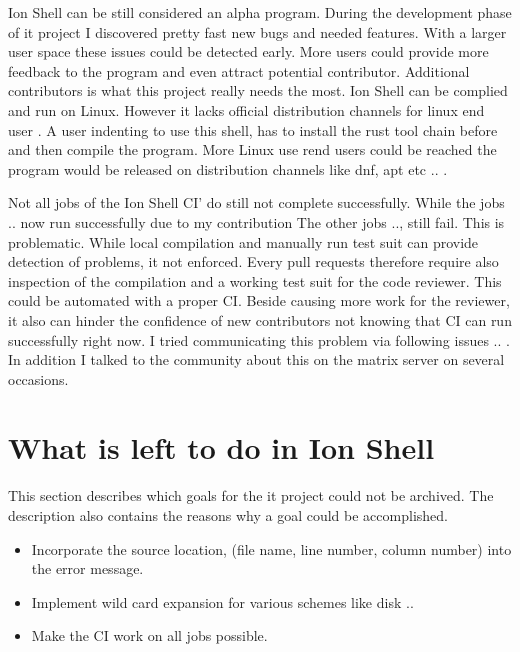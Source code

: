 \itemIonShellDistribution

Ion Shell can be still considered an alpha program.
During the development phase of it project I discovered pretty fast new bugs and needed features.
With a larger user space these issues could be detected early.
More users could provide more feedback to the program and even attract potential contributor.
Additional contributors is what this project really needs the most.
Ion Shell can be complied and run on Linux.
However it lacks official distribution channels for linux end user .
A user indenting to use this shell, has to install the rust tool chain before and then compile the program.
More Linux use rend users could be reached the program would be released on distribution channels like dnf, apt etc .. .

\itemIonShellCI

Not all jobs of the Ion Shell CI' do still not complete successfully.
While the jobs .. now run successfully due to my contribution
The other jobs .., still fail.
This is problematic. While local compilation and manually run test suit can provide detection of problems, it not enforced.
Every pull requests therefore require also inspection of the compilation and a working test suit for the code reviewer.
This could be automated with a proper CI.
Beside causing more work for the reviewer, it also can hinder the confidence of new contributors not knowing that CI can run successfully right now.
I tried communicating this problem via following issues .. .
In addition I talked to the community about this on the matrix server on several occasions.


\section{What is left to do in Ion Shell}

This section describes which goals for the it project could not be archived.
The description also contains the reasons why a goal could be accomplished.

\begin{itemize}
	\item Incorporate the source location, (file name, line number, column number) into the error message.
	\item Implement wild card expansion for various schemes like disk ..
	\item Make the CI work on all jobs possible.
\end{itemize}

